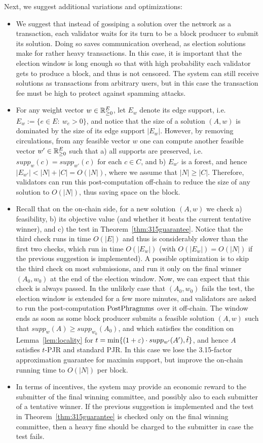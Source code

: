 Next, we suggest additional variations and optimizations:
\begin{itemize}
\item We suggest that instead of gossiping a solution over the network as a transaction, each validator waits for its turn to be a block producer to submit its solution. Doing so saves communication overhead, as election solutions make for rather heavy transactions. In this case, it is important that the election window is long enough so that with high probability each validator gets to produce a block, and thus is not censored. 
The system can still receive solutions as transactions from arbitrary users, but in this case the transaction fee must be high to protect against spamming attacks. 
\item For any weight vector $w\in \mathbb{R}_{\geq 0}^E$, let $E_w$ denote its edge support, i.e. $E_w:=\{e\in E: \ w_e>0\}$, and notice that the size of a solution $(A,w)$ is dominated by the size of its edge support $|E_w|$. 
However, by removing circulations, from any feasible vector $w$ one can compute another feasible vector $w'\in\mathbb{R}_{\geq 0}^E$ such that a) all supports are preserved, i.e. $supp_w(c)=supp_{w'}(c)$ for each $c\in C$, and b) $E_{w'}$ is a forest, and hence $|E_{w'}|< |N|+|C|=O(|N|)$, where we assume that $|N|\geq |C|$. Therefore, validators can run this post-computation off-chain to reduce the size of any solution to $O(|N|)$, thus saving space on the block.
\item Recall that on the on-chain side, for a new solution $(A,w)$ we check a) feasibility, b) its objective value (and whether it beats the current tentative winner), and c) the test in Theorem~\ref{thm:315guarantee}. Notice that the third check runs in time $O(|E|)$ and thus is considerably slower than the first two checks, which run in time $O(|E_w|)$ (with $O(|E_w|)=O(|N|)$ if the previous suggestion is implemented). A possible optimization is to skip the third check on most submissions, and run it only on the final winner $(A_0, w_0)$ at the end of the election window. 
Now, we can expect that this check is always passed. 
In the unlikely case that $(A_0, w_0)$ fails the test, the election window is extended for a few more minutes, and validators are asked to run the post-computation $\operatorname{PostPhragmms}$ over it off-chain. The window ends as soon as some block producer submits a feasible solution $(A,w)$ such that $supp_{w}(A)\geq supp_{w_0}(A_0)$, and which satisfies the condition on Lemma~\ref{lem:locality} for $t=\min\{(1+\varepsilon)\cdot supp_{w'}(A'), \hat{t}\}$, and hence $A$ satisfies $t$-PJR and standard PJR. In this case we lose the 3.15-factor approximation guarantee for maximin support, but improve the on-chain running time to $O(|N|)$ per block.
\item In terms of incentives, the system may provide an economic reward to the submitter of the final winning committee, and possibly also to each submitter of a tentative winner. If the previous suggestion is implemented and the test in Theorem~\ref{thm:315guarantee} is checked only on the final winning committee, then a heavy fine should be charged to the submitter in case the test fails. 
\end{itemize}